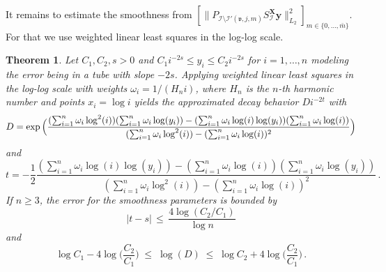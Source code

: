\documentclass[a4paper]{scrartcl}
\numberwithin{equation}{section}
\newtheorem{theorem}{Theorem}[section]
\begin{document}
It remains to estimate the smoothness from $[\|P_{\mathcal I\setminus\mathcal I'(\mathfrak v,j,m)} S_{\mathcal I}^{\bm X}\bm y\|_{L_2}^2 ]_{m\in\{0,\dots,\bar m\}}$.
For that we use weighted linear least squares in the log-log scale.

\begin{theorem}\label{learrates} Let $C_1,C_2,s>0$ and $C_1i^{-2s}\le y_i \le C_2i^{-2s}$ for $i=1,\dots,n$ modeling the error being in a tube with slope $-2s$.
    Applying weighted linear least squares in the log-log scale with weights $\omega_i = 1/(H_n i)$, where $H_n$ is the $n$-th harmonic number and points $x_i = \log i$ yields the approximated decay behavior $D i^{-2t}$ with
    \begin{equation*}
        D = \exp\Big(\frac{(\sum_{i=1}^{n}\omega_i \log^2(i))(\sum_{i=1}^{n} \omega_i \log(y_i)) - (\sum_{i=1}^{n} \omega_i \log(i) \log(y_i))(\sum_{i=1}^{n}\omega_i \log(i))}{(\sum_{i=1}^{n}\omega_i \log^2(i))-(\sum_{i=1}^{n}\omega_i \log(i))^2}\Big) \\
    \end{equation*}
    and
    \begin{equation*}
        t = -\frac 12 \frac{(\sum_{i=1}^{n}\omega_i \log(i) \log(y_i)) - (\sum_{i=1}^{n} \omega_i \log(i))(\sum_{i=1}^{n} \omega_i \log(y_i))}{(\sum_{i=1}^{n}\omega_i \log^2(i)) - (\sum_{i=1}^{n}\omega_i \log(i))^2} \,.
    \end{equation*}
    If $n\ge 3$, the error for the smoothness parameters is bounded by
    \begin{equation*}
        |t-s| \,\le\, \frac{4\log(C_2/C_1)}{\log n}
    \end{equation*}
    and
    \begin{equation*}
        \log C_1 - 4\log\Big(\frac{C_2}{C_1}\Big)
        \;\le\; \log(D)
        \;\le\; \log C_2 + 4\log\Big(\frac{C_2}{C_1}\Big) \,.
    \end{equation*}
\end{theorem} 
\end{document}
